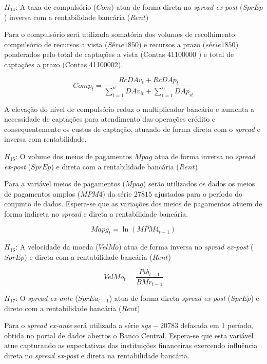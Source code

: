 \documentclass[
  12pt,
  12pt,
  openright,
  oneside,
  a4paper,
  chapter=TITLE,
  section=TITLE,
  subsection=TITLE,
  subsubsection=TITLE,
  english,
  portugues,
  sumario=tradicional]{abntex2}
\begin{document}
\(H_{14}\): A taxa de compulsório (\(Com\)) atua de forma direta no \emph{spread ex-post} (\(SprEp\)) inversa com a rentabilidade bancária (\(Rent\))

Para o compulsório será utilizada somatória dos volumes de recolhimento compulsório de recursos a vista (\(Série 1850\)) e recursos a prazo (\(série 1850\)) ponderados pelo total de captações a vista (Contas 41100000 ) e total de captações a prazo (Contas 41100002).

\begin{equation}
Comp_{t} = \frac{RcDAv_{t} + RcDAp_{t}}{\sum_{t=1}^{n}DAv_{it} + \sum_{t=1}^{n}DAp_{it}}
\end{equation}

A elevação do nível de compulsório reduz o multiplicador bancário e aumenta a necessidade de captações para atendimento das operações crédito e consequentemente os custos de captação, atuando de forma direta com o \emph{spread} e inversa com rentabilidade.

\(H_{15}\): O volume dos meios de pagamentos \(Mpag\) atua de forma inversa no \emph{spread ex-post} (\(SprEp\)) e direta com a rentabilidade bancária (\(Rent\))

Para a variável meios de pagamentos (\(Mpag\)) serão utilizados os dados os meios de pagamentos amplos (\(MPM4\)) da série \(27815\) ajustados para o período do conjunto de dados. Espera-se que as variações dos meios de pagamentos atuem de forma indireta no \emph{spread} e direta a rentabilidade bancária.

\begin{equation}
Mapg_{t} = \ln(MPM4_{t-1})
\end{equation}

\(H_{16}\): A velocidade da moeda (\(VelMo\)) atua de forma inversa no \emph{spread ex-post} (\(SprEp\)) e direta com a rentabilidade bancária (\(Rent\))

\begin{equation}
VelMo_{t} = \frac{Pib_{t-1}}{BMr_{t-1}}
\end{equation}

\(H_{17}\): O \emph{spread ex-ante} (\(SprEa_{t-1}\)) atua de forma direta \emph{spread ex-post} (\(SprEp\)) e direto com a rentabilidade bancária (\(Rent\))

Para o \emph{spread ex-ante} será utilizada a série \(sgs-20783\) defasada em 1 período, obtida no portal de dados abertos o Banco Central. Espera-se que esta variável atue capturando as expectativas das instituições financeiras exercendo influência direta no \emph{spread ex-post} e direta na rentabilidade bancária.
\end{document}
